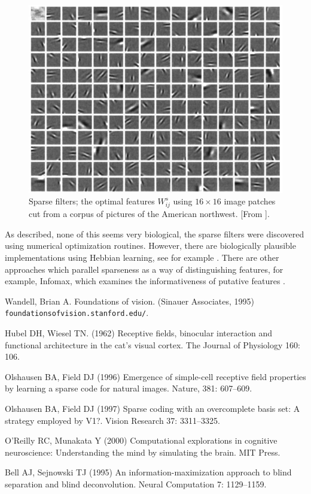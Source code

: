 \documentclass[11pt,a4paper]{scrartcl}
\begin{document}
\begin{figure}
\begin{center}
\includegraphics[width=12cm]{edges.png}
\end{center}
\caption{Sparse filters; the optimal features $W^s_{ij}$ using
  $16\times 16$ image patches cut from a corpus of pictures of the
  American northwest. [From \cite{OlshausenField1996a}].\label{fig:edges}}
\end{figure}

As described, none of this seems very biological, the sparse filters
were discovered using numerical optimization routines. However, there
are biologically plausible implementations using Hebbian learning, see
for example \cite{OReillyMunakata2000a}. There are other approaches
which parallel sparseness as a way of distinguishing features, for
example, Infomax, which examines the informativeness of putative features \cite{BellSejnowski1995a}.


\begin{thebibliography}{10}

Wandell, Brian A. Foundations of vision. 
\newblock(Sinauer Associates, 1995) \texttt{foundationsofvision.stanford.edu/}.

 Hubel DH, Wiesel TN. (1962) Receptive
  fields, binocular interaction and functional architecture in the
  cat's visual cortex.  \newblock The Journal of Physiology 160: 106.

Olshausen BA, Field DJ (1996) Emergence of simple-cell receptive field properties by learning a sparse code for natural images. 
\newblock Nature, 381: 607--609.

Olshausen BA, Field DJ (1997) Sparse coding with an overcomplete basis set: A strategy employed by V1?. 
\newblock Vision Research 37: 3311--3325.

O'Reilly RC, Munakata Y (2000) Computational explorations in cognitive neuroscience: Understanding the mind by simulating the brain. 
\newblock MIT Press.

Bell AJ, Sejnowski TJ (1995) An information-maximization approach to blind separation and blind deconvolution. 
\newblock Neural Computation 7: 1129--1159.



\end{thebibliography}
\end{document}
